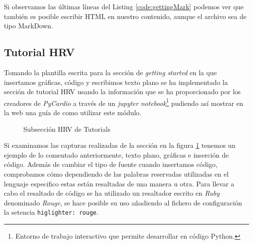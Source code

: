 Si observamos las  últimas líneas del Listing \ref{code:gettingMark} podemos ver que también es posible escribir HTML en nuestro contenido, aunque el archivo sea de tipo MarkDown.

\subsection*{Tutorial HRV}
Tomando la plantilla escrita para la sección de \textit{getting started} en la que insertamos gráficas, código y escribimos texto plano se ha implementado la sección de tutorial HRV usando la información que se ha proporcionado por los creadores de \textit{PyCardio} a través de un \textit{jupyter notebook}\footnote{Entorno de trabajo interactivo que permite desarrollar en código Python.} pudiendo así mostrar en la web una guía de como utilizar este módulo. 


\begin{figure}[H]
    \centering
    \caption{Subsección HRV de Tutorials}
    \label{fig:hrvWeb}
\end{figure}

Si examinamos las capturas realizadas de la sección en la figura \ref{fig:hrvWeb} tenemos un ejemplo de lo comentado anteriormente, texto plano, gráficas e inserción de código. Además de cambiar el tipo de fuente cuando insertamos código, comprobamos cómo dependiendo de las palabras reservadas utilizadas en el lenguaje especifico estas están resaltadas de una manera u otra. Para llevar a cabo el resaltado de código se ha utilizado un resaltador escrito en  \textit{Ruby} denominado \textit{Rouge}, se hace posible su uso añadiendo al fichero de configuración la setencia \texttt{higlighter: rouge}.

